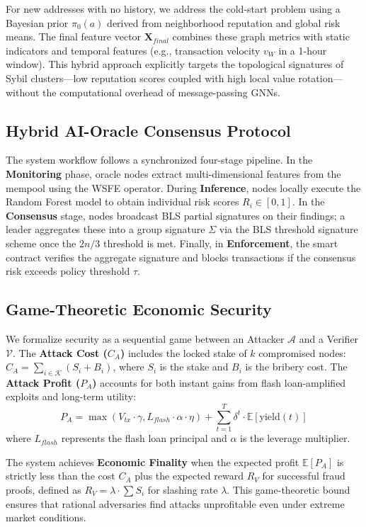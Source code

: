 \documentclass[runningheads]{llncs}
\begin{document}
For new addresses with no history, we address the cold-start problem using a Bayesian prior $\pi_0(a)$ derived from neighborhood reputation and global risk means. The final feature vector $\mathbf{X}_{final}$ combines these graph metrics with static indicators and temporal features (e.g., transaction velocity $v_W$ in a 1-hour window). This hybrid approach explicitly targets the topological signatures of Sybil clusters—low reputation scores coupled with high local value rotation—without the computational overhead of message-passing GNNs.

\subsection{Hybrid AI-Oracle Consensus Protocol}
The system workflow follows a synchronized four-stage pipeline. In the \textbf{Monitoring} phase, oracle nodes extract multi-dimensional features from the mempool using the WSFE operator. During \textbf{Inference}, nodes locally execute the Random Forest model to obtain individual risk scores $R_i \in [0,1]$. In the \textbf{Consensus} stage, nodes broadcast BLS partial signatures on their findings; a leader aggregates these into a group signature $\Sigma$ via the BLS threshold signature scheme \cite{gennaro2003threshold} once the $2n/3$ threshold is met. Finally, in \textbf{Enforcement}, the smart contract verifies the aggregate signature and blocks transactions if the consensus risk exceeds policy threshold $\tau$.

\subsection{Game-Theoretic Economic Security}
We formalize security as a sequential game between an Attacker $\mathcal{A}$ and a Verifier $\mathcal{V}$. The \textbf{Attack Cost ($C_A$)} includes the locked stake of $k$ compromised nodes: $C_A = \sum_{i \in \mathcal{K}} (S_i + B_i)$, where $S_i$ is the stake and $B_i$ is the bribery cost. The \textbf{Attack Profit ($P_A$)} accounts for both instant gains from flash loan-amplified exploits and long-term utility:
\begin{equation}
    P_A = \max\left(V_{tx} \cdot \gamma, L_{flash} \cdot \alpha \cdot \eta\right) + \sum_{t=1}^{T} \delta^t \cdot \mathbb{E}[\text{yield}(t)]
\end{equation}
where $L_{flash}$ represents the flash loan principal and $\alpha$ is the leverage multiplier. 

The system achieves \textbf{Economic Finality} when the expected profit $\mathbb{E}[P_A]$ is strictly less than the cost $C_A$ plus the expected reward $R_V$ for successful fraud proofs, defined as $R_V = \lambda \cdot \sum S_i$ for slashing rate $\lambda$. This game-theoretic bound ensures that rational adversaries find attacks unprofitable even under extreme market conditions.
\end{document}
